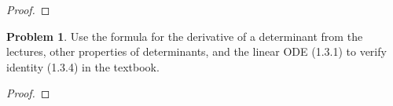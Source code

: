 \documentclass[12pt]{article}
\theoremstyle{definition}
\newtheorem{problem}{Problem}
\begin{document}
\begin{proof}
\end{proof}
\newpage


\begin{problem}
  Use the formula for the derivative of a determinant from the lectures, other
  properties of determinants, and the linear ODE (1.3.1) to verify identity
  (1.3.4) in the textbook.
\end{problem}

\begin{proof}
\end{proof}
\end{document}
